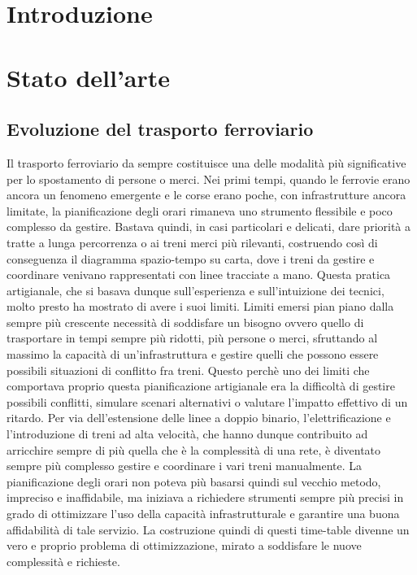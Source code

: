 \documentclass[a4paper,12pt]{report}
\begin{document}
\chapter*{Introduzione}


\chapter{Stato dell’arte}

\section{Evoluzione del trasporto ferroviario}
Il trasporto ferroviario da sempre costituisce una delle modalità più significative per lo spostamento di persone o merci. Nei primi tempi, quando le ferrovie erano ancora un fenomeno emergente e le corse erano poche, con infrastrutture ancora limitate, la pianificazione degli orari rimaneva uno strumento flessibile e poco complesso da gestire. Bastava quindi, in casi particolari e delicati, dare priorità a tratte a lunga percorrenza o ai treni merci più rilevanti, costruendo così di conseguenza il diagramma spazio-tempo su carta, dove i treni da gestire e coordinare venivano rappresentati con linee tracciate a mano. Questa pratica artigianale, che si basava dunque sull'esperienza e sull'intuizione dei tecnici, molto presto ha mostrato di avere i suoi limiti. Limiti emersi pian piano dalla sempre più crescente necessità di soddisfare un bisogno ovvero quello di trasportare in tempi sempre più ridotti, più persone o merci, sfruttando al massimo la capacità di un'infrastruttura e gestire quelli che possono essere possibili situazioni di conflitto fra treni.
Questo perchè uno dei limiti che comportava proprio questa pianificazione artigianale era la difficoltà di gestire possibili conflitti, simulare scenari alternativi o valutare l’impatto effettivo di un ritardo. Per via dell'estensione delle linee a doppio binario, l'elettrificazione e l'introduzione di treni ad alta velocità, che hanno dunque contribuito ad arricchire sempre di più quella che è la complessità di una rete, è diventato sempre più complesso gestire e coordinare i vari treni manualmente.
La pianificazione degli orari non poteva più basarsi quindi sul vecchio metodo, impreciso e inaffidabile, ma iniziava a richiedere strumenti sempre più precisi in grado di ottimizzare l’uso della capacità infrastrutturale e garantire una buona affidabilità di tale servizio. La costruzione quindi di questi time-table divenne un vero e proprio problema di ottimizzazione, mirato a soddisfare le nuove complessità e richieste.
\end{document}
